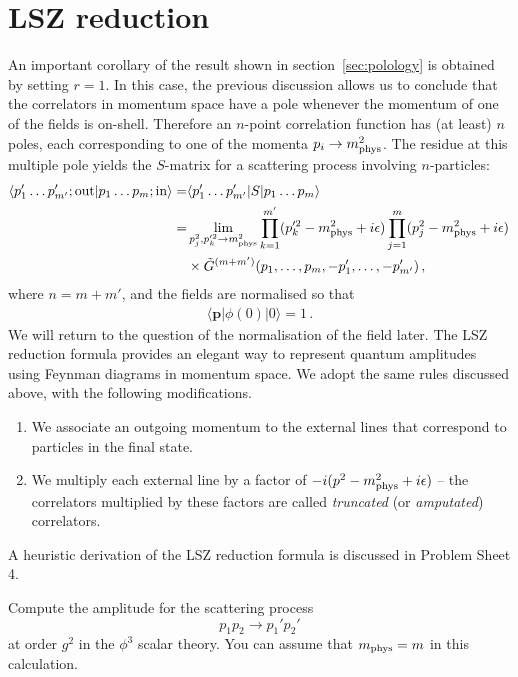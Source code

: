 \section{LSZ reduction}
\label{sec:lsz-reduction}

An important corollary of the result shown in
section~\ref{sec:polology} is obtained by setting $r=1$. In this case,
the previous discussion allows us to conclude that the correlators in
momentum space have a pole whenever the momentum of one of the fields
is on-shell. Therefore an $n$-point correlation function has (at
least) $n$ poles, each corresponding to one of the momenta
$p_i\to m_\mathrm{phys}^2$. The residue at this multiple pole yields the $S$-matrix
for a scattering process involving $n$-particles:
\begin{align}
   \langle p_{1}' \ldots p_{m'}'; \mathrm{out} | p_{1} \ldots p_{m};
  \mathrm{in} \rangle 
  =& 
  \langle p_{1}' \ldots p_{m'}' | S | p_{1} \ldots p_{m} \rangle \\
  =& 
  \lim_{p_j^2,p_k'^2 \to m_\mathrm{phys}^2} \prod_{k=1}^{m'}
  (p_k'^2-m_\mathrm{phys}^2+i\epsilon)
  \prod_{j=1}^{m}
  (p_j^2-m_\mathrm{phys}^2+i\epsilon) \, \nonumber \\
  & \times 
    \tilde{G}^{(m+m')}(p_1, \ldots, p_{m}, -p_1', \ldots, -p_{m'}')\, ,
\end{align}
where $n=m+m'$, and the fields are normalised so that
\begin{align}
  \langle \mathbf{p} | \phi(0) | 0\rangle = 1\,.
\end{align}
We will return to the question of the normalisation of the field
later. The LSZ reduction formula provides an elegant way to represent
quantum amplitudes using Feynman diagrams in momentum space. We adopt
the same rules discussed above, with the following modifications.
\begin{enumerate}
\item We associate an outgoing momentum to the external lines that
  correspond to particles in the final state. 
\item We multiply each external line by a factor of
  $-i(p^2-m_\mathrm{phys}^2+i\epsilon)$ -- the correlators multiplied by these
  factors are called {\em truncated} (or {\em amputated}) correlators.
\end{enumerate}

A heuristic derivation of the LSZ reduction formula is discussed in
Problem Sheet 4.

\begin{Ex}
  Compute the amplitude for the scattering process
  \[
    p_1 p_2 \longrightarrow p_1' p_2'
  \]
  at order $g^2$ in the $\phi^3$ scalar theory. You can assume that
  $m_\mathrm{phys}=m$ in this calculation.
\end{Ex}


